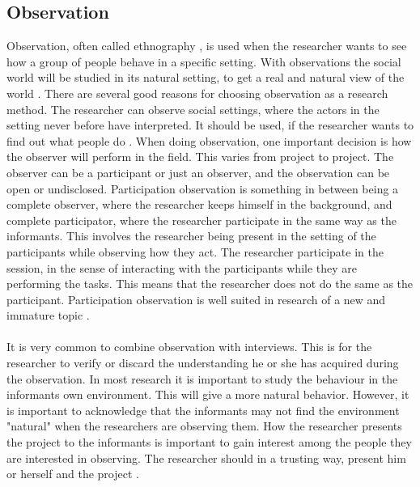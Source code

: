 \subsection{Observation}
Observation, often called ethnography \cite{tjora}, is used when the researcher wants to see how a group of people behave in a specific setting. With observations the social world will be studied in its natural setting, to get a real and natural view of the world \cite{tjora}. There are several good reasons for choosing observation as a research method. The researcher can observe social settings, where the actors in the setting never before have interpreted. It should be used, if the researcher wants to find out what people do \cite{tjora}. When doing observation, one important decision is how the observer will perform in the field. This varies from project to project. The observer can be a participant or just an observer, and the observation can be open or undisclosed. Participation observation is something in between being a complete observer, where the researcher keeps himself in the background, and complete participator, where the researcher participate in the same way as the informants. This involves the researcher being present in the setting of the participants while observing how they act. The researcher participate in the session, in the sense of interacting with the participants while they are performing the tasks. This means that the researcher does not do the same as the participant. Participation observation is well suited in research of a new and immature topic \cite{qualitative}. \\ \\
It is very common to combine observation with interviews. This is for the researcher to verify or discard the understanding he or she has acquired during the observation. In most research it is important to study the behaviour in the informants own environment. This will give a more natural behavior. However, it is important to acknowledge that the informants may not find the environment "natural" when the researchers are observing them. How the researcher presents the project to the informants is important to gain interest among the people they are interested in observing. The researcher should in a trusting way, present him or herself and the project \cite{qualitative}.\\ \\
